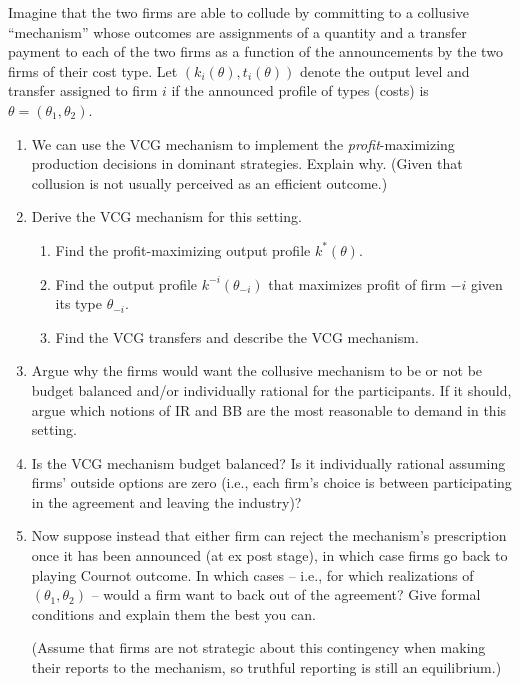 \documentclass[a4paper]{article}
\begin{document}
\smallskip
Imagine that the two firms are able to collude by committing to a collusive “mechanism” whose outcomes are assignments of a quantity and a transfer payment to each of the two firms as a function of the announcements by the two firms of their cost type.  Let $(k_i(\theta),t_i(\theta))$ denote the output level and transfer assigned to firm $i$ if the announced profile of types (costs) is $\theta = (\theta_1, \theta_2)$.

\medskip
\begin{enumerate}
	\item We can use the VCG mechanism to implement the \emph{profit}-maximizing production decisions in dominant strategies.
	Explain why. (Given that collusion is not usually perceived as an efficient outcome.)
	\item Derive the VCG mechanism for this setting.
	\begin{enumerate}
		\item Find the profit-maximizing output profile $k^*(\theta)$.
		\item Find the output profile $k^{-i}(\theta_{-i})$ that maximizes profit of firm $-i$ given its type $\theta_{-i}$.
		\item Find the VCG transfers and describe the VCG mechanism.
	\end{enumerate}
	\item \label{part:irbb} Argue why the firms would want the collusive mechanism to be or not be budget balanced and/or individually rational for the participants. If it should, argue which notions of IR and BB are the most reasonable to demand in this setting.
	\item Is the VCG mechanism budget balanced? Is it individually rational assuming firms' outside options are zero (i.e., each firm's choice is between participating in the agreement and leaving the industry)?
	\item Now suppose instead that either firm can reject the mechanism's prescription once it has been announced (at ex post stage), in which case firms go back to playing Cournot outcome. In which cases -- i.e., for which realizations of $(\theta_1,\theta_2)$ -- would a firm want to back out of the agreement? Give formal conditions and explain them the best you can.
	
	(Assume that firms are not strategic about this contingency when making their reports to the mechanism, so truthful reporting is still an equilibrium.)
\end{enumerate}
\end{document}
